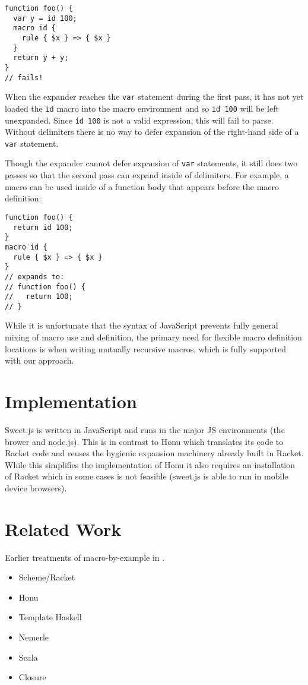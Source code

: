 \documentclass[preprint,10pt]{sigplanconf}
\begin{document}
\begin{lstlisting}
function foo() {
  var y = id 100;
  macro id {
    rule { $x } => { $x }
  }
  return y + y;
}
// fails!
\end{lstlisting}
When the expander reaches the \lstinline!var! statement during the
first pass, it has not yet loaded the \lstinline!id! macro into the
macro environment and so \lstinline!id 100! will be left unexpanded.
Since \lstinline!id 100! is not a valid expression, this will fail to parse.
Without delimiters there is no way to defer expansion of the
right-hand side of a \lstinline!var! statement.

Though the expander cannot defer expansion of \lstinline!var!
statements, it still does two passes so that
the second pass can expand inside of delimiters. For example, a macro
can be used inside of a function body that appears before the macro definition:
\begin{lstlisting}
function foo() {
  return id 100;
}
macro id {
  rule { $x } => { $x }
}
// expands to:
// function foo() {
//   return 100;
// }
\end{lstlisting}

While it is unfortunate that the syntax of JavaScript prevents fully
general mixing of macro use and definition, the primary need for
flexible macro definition locations is when writing mutually recursive
macros, which is fully supported with our approach.

\section{Implementation}
\label{sec:implementation}

Sweet.js is written in JavaScript and runs in the major JS
environments (\ie the brower and node.js). This is in contrast to Honu
which translates its code to Racket code and reuses the hygienic
expansion machinery already built in Racket. While this simplifies
the implementation of Honu it also requires an installation of Racket
which in some cases is not feasible (\eg sweet.js is able to run in
mobile device browsers).


\section{Related Work}
\label{sec:related}

Earlier treatments of macro-by-example in \cite{Kohlbecker1987}.

\begin{itemize}
\item Scheme/Racket
\item Honu
\item Template Haskell
\item Nemerle \cite{Skalski2004}
\item Scala
\item Closure
\end{itemize}
\end{document}
